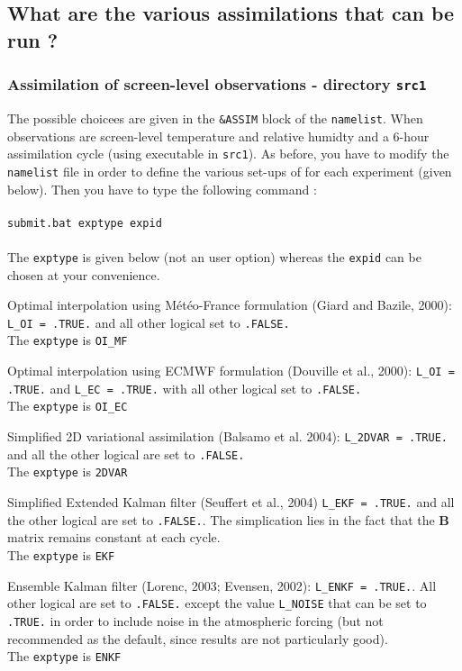 \documentclass[12pt]{article}
\begin{document}
\subsection{What are the various assimilations that can be run ?}
\subsubsection{Assimilation of screen-level observations - directory {\tt src1}}
The possible choicees are given in the {\tt \&ASSIM} block of the {\tt namelist}.
When observations are screen-level temperature and relative humidty
and a 6-hour assimilation cycle (using executable in {\tt src1}).
As before, you have to modify the {\tt namelist} file in order to define the
various set-ups of for each experiment (given below). Then you have to type the
following command :
\\
\\
{\tt submit.bat exptype expid}
\\
\\
The {\tt exptype} is given below (not an user option) whereas the {\tt expid}
can be chosen at your convenience.
\begin{description}
\item {\sc Optimal interpolation using M\'et\'eo-France formulation} (Giard and Bazile, 2000):
{\tt L\_OI = .TRUE.} and all other logical set to {\tt .FALSE.}
\\
The {\tt exptype} is {\tt OI\_MF}
\item {\sc Optimal interpolation using ECMWF formulation} (Douville et al., 2000):
{\tt L\_OI = .TRUE.} and {\tt L\_EC = .TRUE.} with all other logical set to {\tt .FALSE.}
\\
The {\tt exptype} is {\tt OI\_EC}
\item {\sc Simplified 2D variational assimilation} (Balsamo et al. 2004):
{\tt L\_2DVAR = .TRUE.} and all the other logical are set to  {\tt .FALSE.}
\\
The {\tt exptype} is {\tt 2DVAR}
\item {\sc Simplified Extended Kalman filter} (Seuffert et al., 2004)
{\tt L\_EKF = .TRUE.} and all the other logical are set to  {\tt .FALSE.}. The
simplication lies in the fact that the $\mathbf{B}$ matrix remains constant
at each cycle. 
\\
The {\tt exptype} is {\tt  EKF}
\item {\sc Ensemble Kalman filter} (Lorenc, 2003; Evensen, 2002):
{\tt L\_ENKF = .TRUE.}. All other logical are set to {\tt .FALSE.}
except the value {\tt L\_NOISE} that can be set to {\tt .TRUE.} in order
to include noise in the atmospheric forcing (but not recommended as
the default, since results are not particularly good).
\\
The {\tt exptype} is {\tt ENKF}
\end{description}
\end{document}
